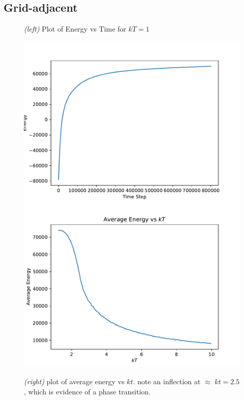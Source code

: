 \documentclass{article}
\begin{document}
\subsection*{Grid-adjacent}
\begin{figure}[H]
  \caption{\textit{(left)} Plot of Energy vs Time for $kT = 1$}
  \includegraphics[scale=0.4]{g_e_0.pdf}
  \includegraphics[scale=0.4]{g_avg_energy.pdf}
  \caption{\textit{(right)} plot of average energy vs $kt$.
    note an inflection at $\approx$ $kt = 2.5$, which is evidence of a
    phase transition.}
\end{figure}
\end{document}
